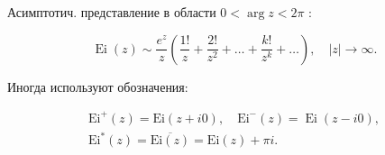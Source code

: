 \documentclass[10pt]{article}
\begin{document}
Асимптотич. представление в области $0<\arg z<2 \pi$ :



\[

\operatorname{Ei}(z) \sim \frac{e^{z}}{z}\left(\frac{1 !}{z}+\frac{2 !}{z^{2}}+\ldots+\frac{k !}{z^{k}}+\ldots\right), \quad|z| \rightarrow \infty .

\]



Иногда используют обозначения:



\[

\begin{gathered}

\mathrm{Ei}^{+}(z)=\mathrm{Ei}(z+i 0), \quad \mathrm{Ei}^{-}(z)=\operatorname{Ei}(z-i 0), \\

\mathrm{Ei}^{*}(z)=\overline{\mathrm{Ei}(z)}=\mathrm{Ei}(z)+\pi i .

\end{gathered}

\]
\end{document}
